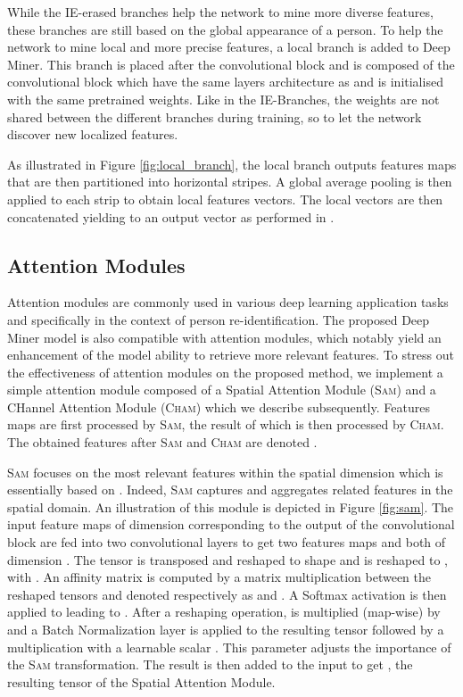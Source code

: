 \documentclass[final]{cvpr}
\begin{document}
While the IE-erased branches help the network to mine more diverse features, these branches are still based on the global appearance of a person. To help the network to mine local and more precise features, a local branch is added to Deep Miner. This branch is placed after the convolutional block  and is composed of the convolutional block  which have the same layers architecture as  and is initialised with the same pretrained weights. Like in the IE-Branches, the weights are not shared between the different branches during training, so to let the network discover new localized features.

As illustrated in Figure \ref{fig:local_branch}, the local branch outputs features maps that are then partitioned into  horizontal stripes. A global average pooling is then applied to each strip to obtain  local features vectors. The  local vectors are then concatenated yielding to an output vector  as performed in \cite{xie2020learning}.  




\subsection{Attention Modules}
\label{ss:attention_module}

Attention modules are commonly used in various deep learning application tasks and specifically in the context of person re-identification. The proposed Deep Miner model is also compatible with attention modules, which notably yield an enhancement of the model ability to retrieve more relevant features. To stress out the effectiveness of attention modules on the proposed method, we implement a simple attention module composed of a Spatial Attention Module (\textsc{Sam}) and a CHannel Attention Module (\textsc{Cham}) which we describe subsequently. Features maps  are first processed by \textsc{Sam}, the result of which is then processed by \textsc{Cham}. The obtained features after \textsc{Sam} and \textsc{Cham} are denoted .

\textsc{Sam} focuses on the most relevant features within the spatial dimension which is essentially based on \cite{chen2019abd, xie2020learning}. Indeed, \textsc{Sam} captures and aggregates related features in the spatial domain. An illustration of this module is depicted in Figure \ref{fig:sam}. The input feature maps  of dimension  corresponding to the output of the convolutional block  are fed into two convolutional layers to get two features maps  and  both of dimension . The tensor  is transposed and reshaped to shape  and  is reshaped to , with . An affinity matrix  is computed by a matrix multiplication between the reshaped tensors  and  denoted respectively as  and . A Softmax activation is then applied to  leading to . After a reshaping operation,  is multiplied (map-wise) by  and a Batch Normalization layer is applied to the resulting tensor followed by a multiplication with a learnable scalar . This parameter adjusts the importance of the \textsc{Sam} transformation. The result is then added to the input  to get , the resulting tensor of the Spatial Attention Module. 
\end{document}
